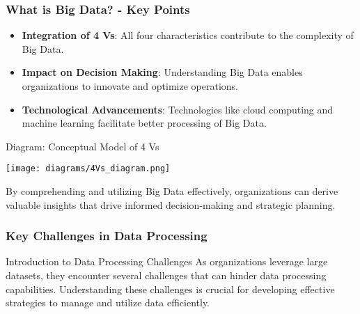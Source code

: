 \documentclass[aspectratio=169]{beamer}
\begin{document}
\begin{frame}[fragile]
    \frametitle{What is Big Data? - Key Points}
    \begin{itemize}
        \item \textbf{Integration of 4 Vs}: All four characteristics contribute to the complexity of Big Data.
        \item \textbf{Impact on Decision Making}: Understanding Big Data enables organizations to innovate and optimize operations.
        \item \textbf{Technological Advancements}: Technologies like cloud computing and machine learning facilitate better processing of Big Data.
    \end{itemize}
    
    \begin{block}{Diagram: Conceptual Model of 4 Vs}
        \begin{center}
            \texttt{[image: diagrams/4Vs\_diagram.png]}
        \end{center}
    \end{block}
    
    By comprehending and utilizing Big Data effectively, organizations can derive valuable insights that drive informed decision-making and strategic planning.
\end{frame}

\begin{frame}[fragile]
    \frametitle{Key Challenges in Data Processing}
    \begin{block}{Introduction to Data Processing Challenges}
        As organizations leverage large datasets, they encounter several challenges that can hinder data processing capabilities. Understanding these challenges is crucial for developing effective strategies to manage and utilize data efficiently.
    \end{block}
\end{frame}
\end{document}
